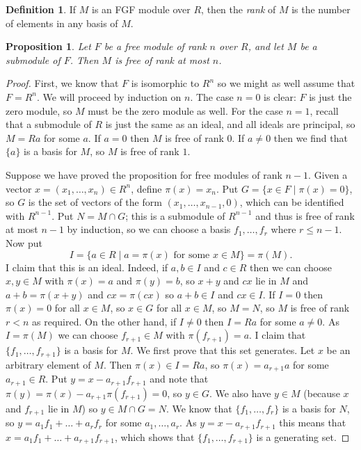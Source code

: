 \documentclass{amsart}
\newcommand{\st}        {\;|\;}
\renewcommand{\:}{\colon}
\newtheorem{proposition}[theorem]{Proposition}
\theoremstyle{definition}
\newtheorem{definition}[theorem]{Definition}
\begin{document}
\begin{definition}
 If $M$ is an FGF module over $R$, then the \emph{rank} of $M$ is the
 number of elements in any basis of $M$.
\end{definition}

\begin{proposition}\label{prop-hereditary}
 Let $F$ be a free module of rank $n$ over $R$, and let $M$ be a
 submodule of $F$.  Then $M$ is free of rank at most $n$.
\end{proposition}
\begin{proof}
 First, we know that $F$ is isomorphic to $R^n$ so we might as well
 assume that $F=R^n$.  We will proceed by induction on $n$.  The case
 $n=0$ is clear: $F$ is just the zero module, so $M$ must be the zero
 module as well.  For the case $n=1$, recall that a submodule of $R$
 is just the same as an ideal, and all ideals are principal, so $M=Ra$
 for some $a$.  If $a=0$ then $M$ is free of rank $0$.  If $a\neq 0$
 then we find that $\{a\}$ is a basis for $M$, so $M$ is free of rank
 $1$. 

 Suppose we have proved the proposition for free modules of rank
 $n-1$.  Given a vector $x=(x_1,\ldots,x_n)\in R^n$, define
 $\pi(x)=x_n$.  Put $G=\{x\in F\st \pi(x)=0\}$, so $G$ is the set of
 vectors of the form $(x_1,\ldots,x_{n-1},0)$, which can be identified
 with $R^{n-1}$.  Put $N=M\cap G$; this is a submodule of $R^{n-1}$
 and thus is free of rank at most $n-1$ by induction, so we can choose
 a basis $f_1,\ldots,f_r$ where $r\leq n-1$.  Now put 
 \[ I = \{a\in R\st a = \pi(x) \text{ for some } x\in M\} = \pi(M). \]
 I claim that this is an ideal.  Indeed, if $a,b\in I$ and $c\in R$
 then we can choose $x,y\in M$ with $\pi(x)=a$ and $\pi(y)=b$, so
 $x+y$ and $cx$ lie in $M$ and $a+b=\pi(x+y)$ and $cx=\pi(cx)$ so
 $a+b\in I$ and $cx\in I$.  If $I=0$ then $\pi(x)=0$ for all $x\in M$,
 so $x\in G$ for all $x\in M$, so $M=N$, so $M$ is free of rank
 $r<n$ as required.  On the other hand, if $I\neq 0$ then $I=Ra$ for
 some $a\neq 0$.  As $I=\pi(M)$ we can choose $f_{r+1}\in M$ with
 $\pi(f_{r+1})=a$.  I claim that $\{f_1,\ldots,f_{r+1}\}$ is a basis
 for $M$.  We first prove that this set generates.  Let $x$ be an
 arbitrary element of $M$.  Then $\pi(x)\in I=Ra$, so
 $\pi(x)=a_{r+1}a$ for some $a_{r+1}\in R$.  Put $y=x-a_{r+1}f_{r+1}$
 and note that $\pi(y)=\pi(x)-a_{r+1}\pi(f_{r+1})=0$, so $y\in G$.  We
 also have $y\in M$ (because $x$ and $f_{r+1}$ lie in $M$) so
 $y\in M\cap G=N$.  We know that $\{f_1,\ldots,f_r\}$ is a basis for
 $N$, so $y=a_1f_1+\ldots+a_rf_r$ for some $a_1,\ldots,a_r$.  As
 $y=x-a_{r+1}f_{r+1}$ this means that
 $x=a_1f_1+\ldots+a_{r+1}f_{r+1}$, which shows that
 $\{f_1,\ldots,f_{r+1}\}$ is a generating set.


\end{proof}
\end{document}
